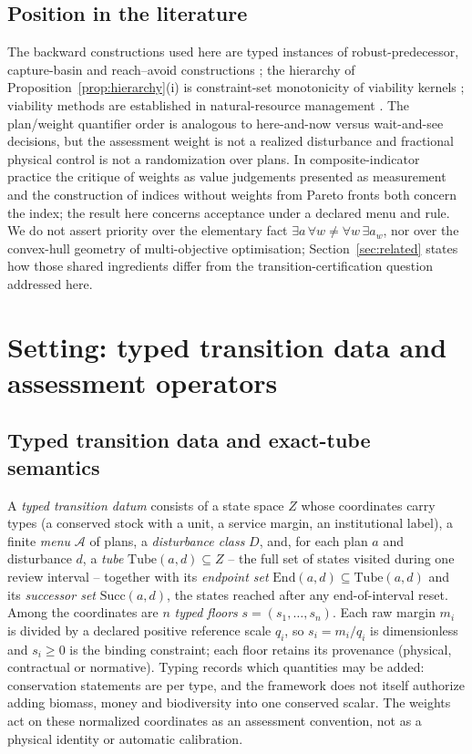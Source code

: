 \documentclass[preprint,11pt,authoryear]{elsarticle}
\theoremstyle{definition}
\theoremstyle{remark}
\newcommand{\Tube}{\mathrm{Tube}}
\newcommand{\Succ}{\mathrm{Succ}}
\newcommand{\End}{\mathrm{End}}
\begin{document}
\subsection{Position in the literature}

The backward constructions used here are typed instances of robust-predecessor, capture-basin and reach--avoid constructions \citep{Aubin1991,Aubin2011,SaintPierre1994,Lygeros1999,AubinCatte2002}; the hierarchy of Proposition~\ref{prop:hierarchy}(i) is constraint-set monotonicity of viability kernels \citep{Aubin1991,Frankowska1989}; viability methods are established in natural-resource management \citep{DeLaraDoyen2008,Doyen2012}. The plan/weight quantifier order is analogous to here-and-now versus wait-and-see decisions, but the assessment weight is not a realized disturbance and fractional physical control is not a randomization over plans. In composite-indicator practice the critique of weights as value judgements presented as measurement \citep{Hickel2020,Fischer2022} and the construction of indices without weights from Pareto fronts \citep{Gao2023} both concern the index; the result here concerns acceptance under a declared menu and rule. We do not assert priority over the elementary fact $\exists a\,\forall w\ne\forall w\,\exists a_w$, nor over the convex-hull geometry of multi-objective optimisation; Section~\ref{sec:related} states how those shared ingredients differ from the transition-certification question addressed here.

\section{Setting: typed transition data and assessment operators}\label{sec:setting}

\subsection{Typed transition data and exact-tube semantics}

A \emph{typed transition datum} consists of a state space $Z$ whose coordinates carry types (a conserved stock with a unit, a service margin, an institutional label), a finite \emph{menu} $\mathcal A$ of plans, a \emph{disturbance class} $D$, and, for each plan $a$ and disturbance $d$, a \emph{tube} $\Tube(a,d)\subseteq Z$ -- the full set of states visited during one review interval -- together with its \emph{endpoint set} $\End(a,d)\subseteq\Tube(a,d)$ and its \emph{successor set} $\Succ(a,d)$, the states reached after any end-of-interval reset. Among the coordinates are $n$ \emph{typed floors} $s=(s_1,\dots,s_n)$. Each raw margin $m_i$ is divided by a declared positive reference scale $q_i$, so $s_i=m_i/q_i$ is dimensionless and $s_i\ge0$ is the binding constraint; each floor retains its provenance (physical, contractual or normative). Typing records which quantities may be added: conservation statements are per type, and the framework does not itself authorize adding biomass, money and biodiversity into one conserved scalar. The weights act on these normalized coordinates as an assessment convention, not as a physical identity or automatic calibration.
\end{document}
